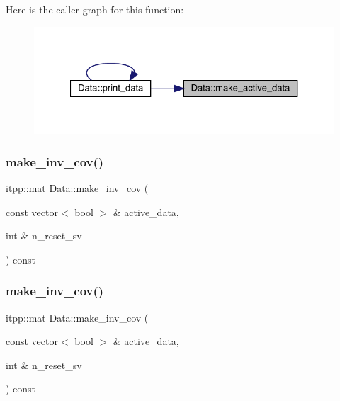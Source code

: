 Here is the caller graph for this function\+:
\nopagebreak
\begin{figure}[H]
\begin{center}
\leavevmode
\includegraphics[width=327pt]{d0/df3/classData_af5d089365e8be78e4cd486bda87f37b4_icgraph}
\end{center}
\end{figure}
\mbox{\label{classData_a39cfb18f88b5b75d640404d87b428820}} 
\subsubsection{\texorpdfstring{make\_inv\_cov()}{make\_inv\_cov()}\hspace{0.1cm}{\footnotesize\ttfamily [1/2]}}
{\footnotesize\ttfamily itpp\+::mat Data\+::make\+\_\+inv\+\_\+cov (\begin{DoxyParamCaption}\item[{const vector$<$ bool $>$ \&}]{active\+\_\+data,  }\item[{int \&}]{n\+\_\+reset\+\_\+sv }\end{DoxyParamCaption}) const}

\mbox{\label{classData_a39cfb18f88b5b75d640404d87b428820}} 
\subsubsection{\texorpdfstring{make\_inv\_cov()}{make\_inv\_cov()}\hspace{0.1cm}{\footnotesize\ttfamily [2/2]}}
{\footnotesize\ttfamily itpp\+::mat Data\+::make\+\_\+inv\+\_\+cov (\begin{DoxyParamCaption}\item[{const vector$<$ bool $>$ \&}]{active\+\_\+data,  }\item[{int \&}]{n\+\_\+reset\+\_\+sv }\end{DoxyParamCaption}) const}


